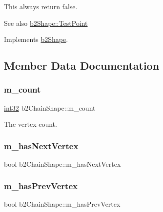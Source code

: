 This always return false. \begin{DoxySeeAlso}{See also}
\mbox{\hyperlink{classb2_shape_a6ac968e403e2d93e8ae46d728a2e50fa}{b2\+Shape\+::\+Test\+Point}} 
\end{DoxySeeAlso}


Implements \mbox{\hyperlink{classb2_shape_a6ac968e403e2d93e8ae46d728a2e50fa}{b2\+Shape}}.



\subsection{Member Data Documentation}
\mbox{\label{classb2_chain_shape_ab2ad711781e6ac81179074e90e0e058b}} 
\subsubsection{\texorpdfstring{m\_count}{m\_count}}
{\footnotesize\ttfamily \mbox{\hyperlink{b2_settings_8h_a43d43196463bde49cb067f5c20ab8481}{int32}} b2\+Chain\+Shape\+::m\+\_\+count}



The vertex count. 

\mbox{\label{classb2_chain_shape_a333b74486566e73c3cf1f7da5e69a96e}} 
\subsubsection{\texorpdfstring{m\_hasNextVertex}{m\_hasNextVertex}}
{\footnotesize\ttfamily bool b2\+Chain\+Shape\+::m\+\_\+has\+Next\+Vertex}

\mbox{\label{classb2_chain_shape_a8a6ffbb9de0e2b8545c8b4fc8aa77249}} 
\subsubsection{\texorpdfstring{m\_hasPrevVertex}{m\_hasPrevVertex}}
{\footnotesize\ttfamily bool b2\+Chain\+Shape\+::m\+\_\+has\+Prev\+Vertex}

